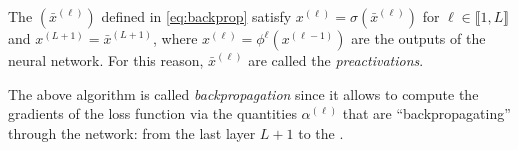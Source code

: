 
\begin{remark}
    The $(\bar x^{(\ell)})$ defined in \eqref{eq:backprop} satisfy $x^{(\ell)}=\sigma(\bar x^{(\ell)})$ for $\ell\in \llbracket1,L\rrbracket$ and $x^{(L+1)}=\bar x^{(L+1)}$, where $x^{(\ell)}=\phi^\ell(x^{(\ell-1)})$ are the outputs of the neural network. 
    For this reason, $\bar x^{(\ell)}$ are called the \emph{preactivations}.
\end{remark}

\begin{remark}
    The above algorithm is called \emph{backpropagation} since it allows to compute the gradients of the loss function via the quantities $\alpha^{(\ell)}$ that are ``backpropagating'' through the network: from the last layer $L+1$ to the \first.
\end{remark}

